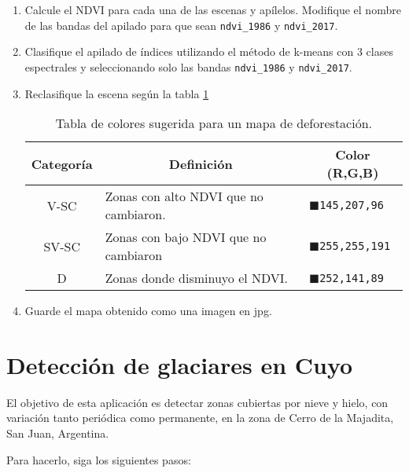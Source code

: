 \begin{enumerate}
\item Calcule el NDVI para cada una de las escenas y apílelos. Modifique el nombre de las bandas del apilado para que sean \texttt{ndvi\_1986} y \texttt{ndvi\_2017}.

\item Clasifique el apilado de índices utilizando el método de k-means con 3 clases espectrales y seleccionando solo las bandas \texttt{ndvi\_1986} y \texttt{ndvi\_2017}.

\item Reclasifique la escena según la tabla \ref{tab:def}

\begin{table}[]
\centering
\begin{tabular}{@{}cll@{}}
\toprule
Categoría & \multicolumn{1}{c}{Definición}        & \multicolumn{1}{c}{Color (R,G,B)}                       \\ \midrule
V-SC      & Zonas con alto NDVI que no cambiaron. & \textcolor{P1}{$\blacksquare$}\texttt{145,207,96} \\
SV-SC     & Zonas con bajo NDVI que no cambiaron  & \textcolor{P2}{$\blacksquare$}\texttt{255,255,191} \\
D         & Zonas donde disminuyo el NDVI.        & \textcolor{P3}{$\blacksquare$}\texttt{252,141,89} \\ \bottomrule
\end{tabular}
\caption{Tabla de colores sugerida para un mapa de deforestación.}
\label{tab:def}
\end{table}

\item Guarde el mapa obtenido como una imagen en jpg.

\end{enumerate}

\section{Detección de glaciares en Cuyo}

El objetivo de esta aplicación es detectar zonas cubiertas por nieve y hielo, con variación tanto periódica como permanente, en la zona de Cerro de la Majadita, San Juan, Argentina.

Para hacerlo, siga los siguientes pasos:

